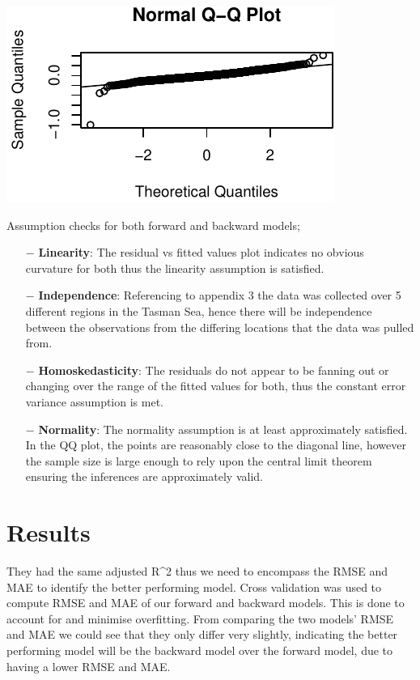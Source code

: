 \documentclass[letterpaper,9pt,twocolumn,twoside,]{pinp}
\begin{document}
\begin{center}\includegraphics{ExecSum_files/figure-latex/unnamed-chunk-7-1} \end{center}

Assumption checks for both forward and backward models;

\begin{itemize}
     \item[$-$] \textbf{Linearity}: The residual vs fitted values plot indicates no obvious curvature for both thus the linearity assumption is satisfied.
     \item[$-$] \textbf{Independence}: Referencing to appendix 3 the data was collected over 5 different regions in the Tasman Sea, hence there will be independence between the observations from the differing locations that the data was pulled from.
     \item[$-$] \textbf{Homoskedasticity}: The residuals do not appear to be fanning out or changing over the range of the fitted values for both, thus the constant error variance assumption is met.
     \item[$-$] \textbf{Normality}: The normality assumption is at least approximately satisfied. In the QQ plot, the points are reasonably close to the diagonal line, however the sample size is large enough to rely upon the central limit theorem ensuring the inferences are approximately valid.
\end{itemize}

\section{Results}\label{results}

They had the same adjusted R\^{}2 thus we need to encompass the RMSE and
MAE to identify the better performing model. Cross validation was used
to compute RMSE and MAE of our forward and backward models. This is done
to account for and minimise overfitting. From comparing the two models'
RMSE and MAE we could see that they only differ very slightly,
indicating the better performing model will be the backward model over
the forward model, due to having a lower RMSE and MAE.
\end{document}
